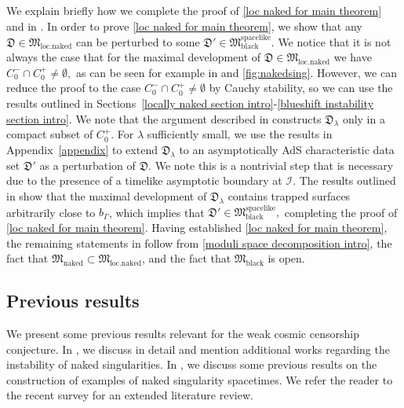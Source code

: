 \documentclass[11pt]{article}
\numberwithin{equation}{section}
\begin{document}
We explain briefly how we complete the proof of \eqref{loc naked for main theorem} and  in . In order to prove \eqref{loc naked for main theorem}, we show that any $\mathfrak{D}\in\mathfrak{M}_{\mathrm{loc.naked}}$ can be perturbed to some $\mathfrak{D}'\in\mathfrak{M}_{\mathrm{black}}^{\mathrm{spacelike}}.$ We notice that it is not always the case that for the maximal development of $\mathfrak{D}\in\mathfrak{M}_{\mathrm{loc.naked}}$ we have $C_0^-\cap C_0^+\neq\emptyset,$ as can be seen for example in  and \ref{fig:nakedsing}. However, we can reduce the proof to the case $C_0^-\cap C_0^+\neq\emptyset$ by Cauchy stability, so we can use the results outlined in Sections~\ref{locally naked section intro}-\ref{blueshift instability section intro}. We note that the argument described in  constructs $\mathfrak{D}_{\lambda}$ only in a compact subset of $C_0^+.$ For $\lambda$ sufficiently small, we use the results in Appendix~\ref{appendix} to extend $\mathfrak{D}_{\lambda}$ to an asymptotically AdS characteristic data set $\mathfrak{D}'$ as a perturbation of $\mathfrak{D}$. We note this is a nontrivial step that is necessary due to the presence of a timelike asymptotic boundary at $\mathcal{I}.$ The results outlined in  show that the maximal development of $\mathfrak{D}_{\lambda}$ contains trapped surfaces arbitrarily close to $b_{\Gamma}$, which implies that $\mathfrak{D}'\in\mathfrak{M}_{\mathrm{black}}^{\mathrm{spacelike}},$ completing the proof of \eqref{loc naked for main theorem}. Having established \eqref{loc naked for main theorem}, the remaining statements in  follow from \eqref{moduli space decomposition intro}, the fact that $\mathfrak{M}_{\mathrm{naked}}\subset\mathfrak{M}_{\mathrm{loc.naked}}$,  and the fact that $\mathfrak{M}_{\mathrm{black}}$ is open.




\subsection{Previous results}\label{previous results section}
We present some previous results relevant for the weak cosmic censorship conjecture. In , we discuss \cite{ChrWCC} in detail and mention additional works regarding the instability of naked singularities. In , we discuss some previous results on the construction of examples of naked singularity spacetimes. We refer the reader to the recent survey \cite{Wccsurvey} for an extended literature review.
\end{document}
